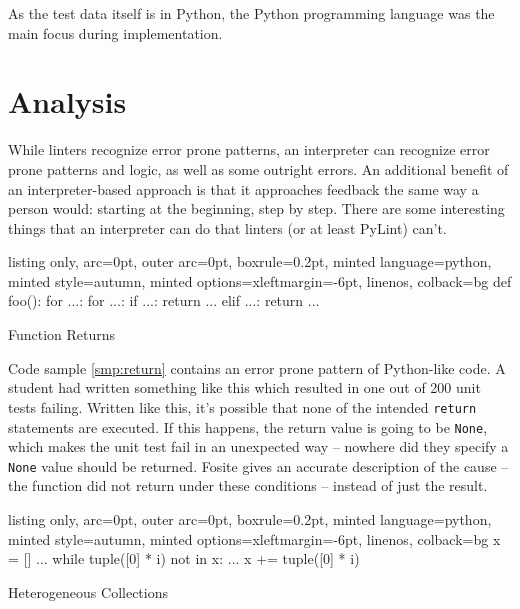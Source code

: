 \documentclass[a4paper, 16pt, oneside]{Thesis}
\begin{document}
As the test data itself is in Python, the Python programming language
was the main focus during implementation.

\section{Analysis}\label{analysis}

While linters recognize error prone patterns, an interpreter can
recognize error prone patterns and logic, as well as some outright
errors. An additional benefit of an interpreter-based approach is that
it approaches feedback the same way a person would: starting at the
beginning, step by step. There are some interesting things that an
interpreter can do that linters (or at least PyLint) can't.

\begin{code}
  \begin{tcblisting}{listing only, 
  arc=0pt,
  outer arc=0pt, 
  boxrule=0.2pt,
  minted language=python,
  minted style=autumn,
  minted options={xleftmargin=-6pt, linenos},
  colback=bg }
def foo():
    for ...:
        for ...:
            if ...:
                return ...
            elif ...:
                return ...
\end{tcblisting}
\caption{Function Returns} \label{smp:return}
\end{code}

Code sample \ref{smp:return} contains an error prone pattern of
Python-like code. A student had written something like this which
resulted in one out of 200 unit tests failing. Written like this, it's
possible that none of the intended \texttt{return} statements are
executed. If this happens, the return value is going to be
\texttt{None}, which makes the unit test fail in an unexpected way --
nowhere did they specify a \texttt{None} value should be returned.
Fosite gives an accurate description of the cause -- the function did
not return under these conditions -- instead of just the result.

\begin{code}
  \begin{tcblisting}{listing only, 
  arc=0pt,
  outer arc=0pt, 
  boxrule=0.2pt,
  minted language=python,
  minted style=autumn,
  minted options={xleftmargin=-6pt, linenos},
  colback=bg }
x = []
...
while tuple([0] * i) not in x:
    ...
    x += tuple([0] * i)
\end{tcblisting}
\caption{Heterogeneous Collections} \label{smp:nohomo}
\end{code}
\end{document}
